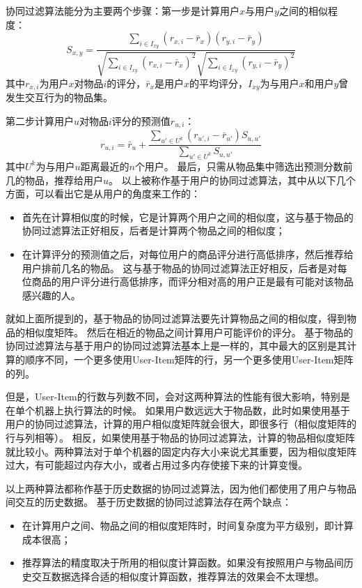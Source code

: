 协同过滤算法能分为主要两个步骤：第一步是计算用户$x$与用户$y$之间的相似程度：
\begin{equation}
S_{x,y} = \frac{\sum_{i\in I_{xy}}(r_{x,i}-\bar{r}_x)(r_{y,i}-\bar{r}_y)}{\sqrt{\sum_{i\in I_{xy}}(r_{x,i}-\bar{r}_x)^2}\sqrt{\sum_{i\in I_{xy}}(r_{y,i}-\bar{r}_y)^2}}
\end{equation}
其中$r_{x,i}$为用户$x$对物品$i$的评分，$\bar{r}_x$是用户$x$的平均评分，$I_{xy}$为与用户$x$和用户$y$曾发生交互行为的物品集。

第二步计算用户$u$对物品$i$评分的预测值$r_{u,i}$：
\begin{equation}
r_{u,i} = \bar{r}_u + \frac{\sum_{u'\in U^k}(r_{u',i}-\bar{r}_{u'})S_{u,u'}}{\sum_{u'\in U^k}S_{u,u'}}
\end{equation}
其中$U^k$为与用户$u$距离最近的$n$个用户。
最后，只需从物品集中筛选出预测分数前几的物品，推荐给用户$u$。
以上被称作基于用户的协同过滤算法，其中从以下几个方面，可以看出它是从用户的角度来工作的：
\begin{itemize}
\item 首先在计算相似度的时候，它是计算两个用户之间的相似度，这与基于物品的协同过滤算法正好相反，后者是计算两个物品之间的相似度；
\item 在计算评分的预测值之后，对每位用户的商品评分进行高低排序，然后推荐给用户排前几名的物品。
这与基于物品的协同过滤算法正好相反，后者是对每位商品的用户评分进行高低排序，而评分相对高的用户正是最有可能对该物品感兴趣的人。
\end{itemize}

就如上面所提到的，基于物品的协同过滤算法要先计算物品之间的相似度，得到物品的相似度矩阵。
然后在相近的物品之间计算用户可能评价的评分。
基于物品的协同过滤算法与基于用户的协同过滤算法基本上是一样的，其中最大的区别是其计算的顺序不同，一个更多使用User-Item矩阵的行，另一个更多使用User-Item矩阵的列。

但是，User-Item的行数与列数不同，会对这两种算法的性能有很大影响，特别是在单个机器上执行算法的时候。
如果用户数远远大于物品数，此时如果使用基于用户的协同过滤算法，计算的用户相似度矩阵就会很大，即很多行（相似度矩阵的行与列相等）。
相反，如果使用基于物品的协同过滤算法，计算的物品相似度矩阵就比较小。两种算法对于单个机器的固定内存大小来说尤其重要，因为相似度矩阵过大，有可能超过内存大小，或者占用过多内存使接下来的计算变慢。

以上两种算法都称作基于历史数据的协同过滤算法，因为他们都使用了用户与物品间交互的历史数据。
基于历史数据的协同过滤算法存在两个缺点：
\begin{itemize}
\item 在计算用户之间、物品之间的相似度矩阵时，时间复杂度为平方级别，即计算成本很高；
\item 推荐算法的精度取决于所用的相似度计算函数。如果没有按照用户与物品间历史交互数据选择合适的相似度计算函数，推荐算法的效果会不太理想。
\end{itemize}


